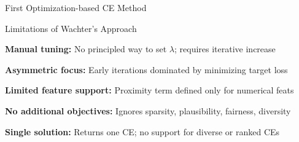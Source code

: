 \documentclass[10pt,compress,t,notes=noshow,xcolor=table]{beamer}
\begin{document}
\begin{framev}[align=top]{First Optimization-based CE Method }
\end{framev}


\begin{framei}[align=top]{Limitations of Wachter's Approach}
\item \textbf{Manual tuning:} No principled way to set $\lambda$; requires iterative increase
\item \textbf{Asymmetric focus:} Early iterations dominated by minimizing target loss
\item \textbf{Limited feature support:} Proximity term defined only for numerical feats
\item \textbf{No additional objectives:} Ignores sparsity, plausibility, fairness, diversity
\item \textbf{Single solution:} Returns one CE; no support for diverse or ranked CEs
\end{framei}
\end{document}
